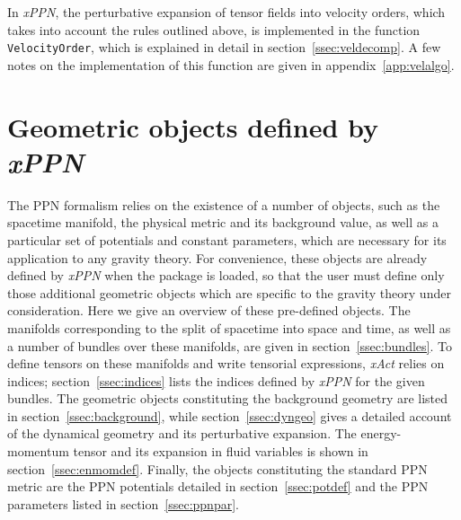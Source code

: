 \documentclass[notitlepage,a4paper,aps,prd,onecolumn,superscriptaddress,nofootinbib,groupedaddress,longbibliography]{revtex4-1}
\newcommand{\xPPN}{\emph{xPPN}}
\newcommand{\xAct}{\emph{xAct}}
\begin{document}
In \xPPN, the perturbative expansion of tensor fields into velocity orders, which takes into account the rules outlined above, is implemented in the function \lstinline/VelocityOrder/, which is explained in detail in section~\ref{ssec:veldecomp}. A few notes on the implementation of this function are given in appendix~\ref{app:velalgo}.

\section{Geometric objects defined by \xPPN}\label{sec:objects}
The PPN formalism relies on the existence of a number of objects, such as the spacetime manifold, the physical metric and its background value, as well as a particular set of potentials and constant parameters, which are necessary for its application to any gravity theory. For convenience, these objects are already defined by \xPPN{} when the package is loaded, so that the user must define only those additional geometric objects which are specific to the gravity theory under consideration. Here we give an overview of these pre-defined objects. The manifolds corresponding to the split of spacetime into space and time, as well as a number of bundles over these manifolds, are given in section~\ref{ssec:bundles}. To define tensors on these manifolds and write tensorial expressions, \xAct{} relies on indices; section~\ref{ssec:indices} lists the indices defined by \xPPN{} for the given bundles. The geometric objects constituting the background geometry are listed in section~\ref{ssec:background}, while section~\ref{ssec:dyngeo} gives a detailed account of the dynamical geometry and its perturbative expansion. The energy-momentum tensor and its expansion in fluid variables is shown in section~\ref{ssec:enmomdef}. Finally, the objects constituting the standard PPN metric are the PPN potentials detailed in section~\ref{ssec:potdef} and the PPN parameters listed in section~\ref{ssec:ppnpar}.
\end{document}
